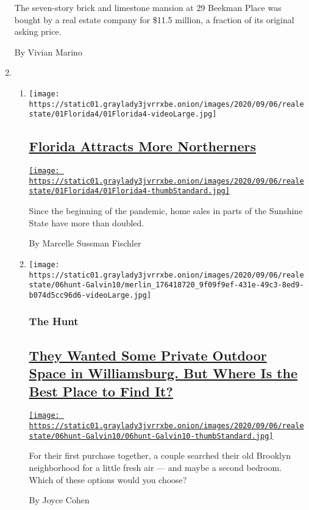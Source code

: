 \begin{enumerate}
  The seven-story brick and limestone mansion at 29 Beekman Place was
  bought by a real estate company for \$11.5 million, a fraction of its
  original asking price.

  By Vivian Marino
\item
  \begin{enumerate}
  \def\labelenumii{\arabic{enumii}.}
  \item
    \texttt{[image: https://static01.graylady3jvrrxbe.onion/images/2020/09/06/realestate/01Florida4/01Florida4-videoLarge.jpg]}

    \hypertarget{florida-attracts-more-northerners}{%
    \subsection{\texorpdfstring{\href{/2020/09/04/realestate/moving-to-florida.html}{Florida
    Attracts More
    Northerners}}{Florida Attracts More Northerners}}\label{florida-attracts-more-northerners}}

    \href{/2020/09/04/realestate/moving-to-florida.html}{\texttt{[image: https://static01.graylady3jvrrxbe.onion/images/2020/09/06/realestate/01Florida4/01Florida4-thumbStandard.jpg]}}

    Since the beginning of the pandemic, home sales in parts of the
    Sunshine State have more than doubled.

    By Marcelle Sussman Fischler
  \item
    \texttt{[image: https://static01.graylady3jvrrxbe.onion/images/2020/09/06/realestate/06hunt-Galvin10/merlin\_176418720\_9f09f9ef-431e-49c3-8ed9-b074d5cc96d6-videoLarge.jpg]}

    \hypertarget{the-hunt}{%
    \subsubsection{The Hunt}\label{the-hunt}}

    \hypertarget{they-wanted-some-private-outdoor-space-in-williamsburg-but-where-is-the-best-place-to-find-it}{%
    \subsection{\texorpdfstring{\href{/interactive/2020/09/03/realestate/03hunt-galvin.html}{They
    Wanted Some Private Outdoor Space in Williamsburg. But Where Is the
    Best Place to Find
    It?}}{They Wanted Some Private Outdoor Space in Williamsburg. But Where Is the Best Place to Find It?}}\label{they-wanted-some-private-outdoor-space-in-williamsburg-but-where-is-the-best-place-to-find-it}}

    \href{/interactive/2020/09/03/realestate/03hunt-galvin.html}{\texttt{[image: https://static01.graylady3jvrrxbe.onion/images/2020/09/06/realestate/06hunt-Galvin10/06hunt-Galvin10-thumbStandard.jpg]}}

    For their first purchase together, a couple searched their old
    Brooklyn neighborhood for a little fresh air --- and maybe a second
    bedroom. Which of these options would you choose?

    By Joyce Cohen
  \end{enumerate}
\end{enumerate}

